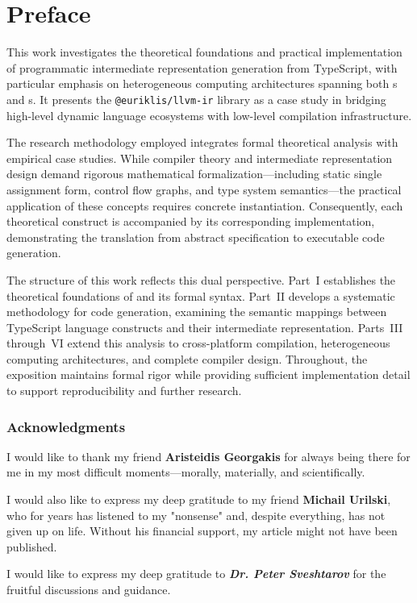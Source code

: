 \frontmatter

\chapter*{Preface}

This work investigates the theoretical foundations and practical implementation of programmatic  intermediate representation generation from TypeScript, with particular emphasis on heterogeneous computing architectures spanning both s and s. It presents the \texttt{@euriklis/llvm-ir} library as a case study in bridging high-level dynamic language ecosystems with low-level compilation infrastructure.

The research methodology employed integrates formal theoretical analysis with empirical case studies. While compiler theory and intermediate representation design demand rigorous mathematical formalization—including static single assignment form, control flow graphs, and type system semantics—the practical application of these concepts requires concrete instantiation. Consequently, each theoretical construct is accompanied by its corresponding implementation, demonstrating the translation from abstract specification to executable code generation.

The structure of this work reflects this dual perspective. Part~I establishes the theoretical foundations of   and its formal syntax. Part~II develops a systematic methodology for code generation, examining the semantic mappings between TypeScript language constructs and their intermediate representation. Parts~III through~VI extend this analysis to cross-platform compilation, heterogeneous computing architectures, and complete compiler design. Throughout, the exposition maintains formal rigor while providing sufficient implementation detail to support reproducibility and further research.

\subsection*{Acknowledgments}

\hspace{\parindent}I would like to thank my friend \textbf{Aristeidis Georgakis} for always being there for me in my most difficult moments—morally, materially, and scientifically.

I would also like to express my deep gratitude to my friend \textbf{Michail Urilski}, who for years has listened to my "nonsense" and, despite everything, has not given up on life. Without his financial support, my article might not have been published.

I would like to express my deep gratitude to \textbf{\textit{Dr. Peter Sveshtarov}} for the fruitful discussions and guidance.



\tableofcontents

\mainmatter

